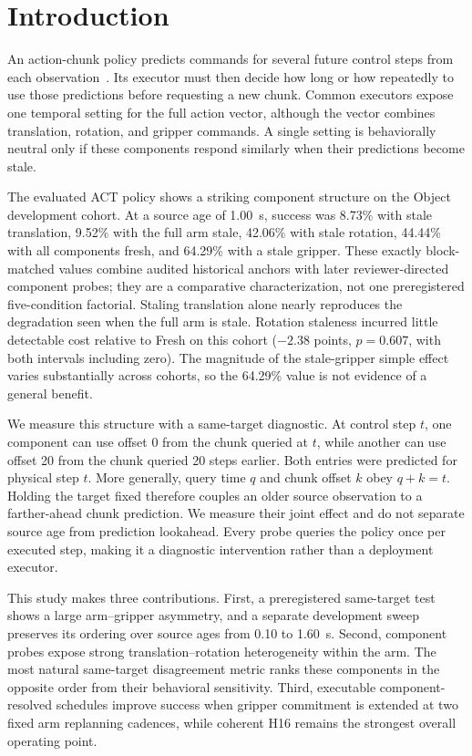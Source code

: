 \section{Introduction}
\label{sec:introduction}

An action-chunk policy predicts commands for several future control steps from
each observation~\cite{zhao2023act}. Its executor must then decide how long or
how repeatedly to use those predictions before requesting a new chunk. Common
executors expose one temporal setting for the full action vector, although the
vector combines translation, rotation, and gripper commands. A single setting
is behaviorally neutral only if these components respond similarly when their
predictions become stale.

The evaluated ACT policy shows a striking component structure on the Object
development cohort. At a source age of 1.00~s, success was 8.73\% with stale
translation, 9.52\% with the full arm stale, 42.06\% with stale rotation,
44.44\% with all components fresh, and 64.29\% with a stale gripper. These
exactly block-matched values combine audited historical anchors with later
reviewer-directed component probes; they are a comparative characterization,
not one preregistered five-condition factorial. Staling translation alone
nearly reproduces the degradation seen when the full arm is stale. Rotation
staleness incurred little detectable cost relative to Fresh on this cohort
($-2.38$ points, $p=0.607$, with both intervals including zero). The magnitude
of the stale-gripper simple effect varies substantially across cohorts, so the
64.29\% value is not evidence of a general benefit.

We measure this structure with a same-target diagnostic. At control step $t$,
one component can use offset 0 from the chunk queried at $t$, while another can
use offset 20 from the chunk queried 20 steps earlier. Both entries were
predicted for physical step $t$. More generally, query time $q$ and chunk
offset $k$ obey $q+k=t$. Holding the target fixed therefore couples an older
source observation to a farther-ahead chunk prediction. We measure their joint
effect and do not separate source age from prediction lookahead. Every probe
queries the policy once per executed step, making it a diagnostic intervention
rather than a deployment executor.

This study makes three contributions. First, a preregistered same-target test
shows a large arm--gripper asymmetry, and a separate development sweep preserves
its ordering over source ages from 0.10 to 1.60~s. Second, component probes
expose strong translation--rotation heterogeneity within the arm. The most
natural same-target disagreement metric ranks these components in the opposite
order from their behavioral sensitivity. Third, executable component-resolved
schedules improve success when gripper
commitment is extended at two fixed arm replanning cadences, while coherent H16
remains the strongest overall operating point.

